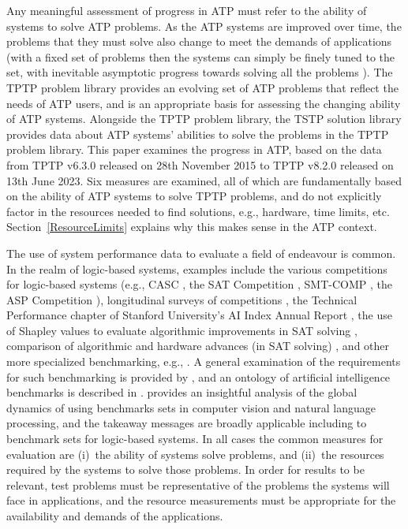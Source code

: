 \documentclass[runningheads]{llncs}
\begin{document}
Any meaningful assessment of progress in ATP must refer to the ability of systems to solve 
ATP problems.
As the ATP systems are improved over time, the problems that they must solve also change to meet 
the demands of applications (with a fixed set of problems then the systems can simply be finely 
tuned to the set, with inevitable asymptotic progress towards solving all the problems 
\cite{OB+22}).
The TPTP problem library provides an evolving set of ATP problems that reflect the needs of 
ATP users, and is an appropriate basis for assessing the changing ability of ATP systems.
Alongside the TPTP problem library, the TSTP solution library provides data about ATP systems' 
abilities to solve the problems in the TPTP problem library.
This paper examines the progress in ATP, based on the data from TPTP v6.3.0 released on 
28th November 2015 to TPTP v8.2.0 released on 13th June 2023.
Six measures are examined, all of which
are fundamentally based on the ability of ATP systems to solve TPTP problems, and do not 
explicitly factor in the resources needed to find solutions, e.g., hardware, time limits, etc. 
Section~\ref{ResourceLimits} explains why this makes sense in the ATP context.

The use of system performance data to evaluate a field of endeavour is common.
In the realm of logic-based systems, examples include
the various competitions \cite{BB+19} for logic-based systems (e.g., CASC \cite{Sut16}, the SAT 
Competition \cite{JL+12}, SMT-COMP \cite{BdS05}, the ASP Competition \cite{CI+12}),
longitudinal surveys of competitions \cite{SS06-SoCASC,CSW15},
the Technical Performance chapter of Stanford University's AI Index Annual Report \cite{MF+23},
the use of Shapley values to evaluate algorithmic improvements in SAT solving \cite{FK+16,KF+19},
comparison of algorithmic and hardware advances (in SAT solving) \cite{FHS20},
and
other more specialized benchmarking, e.g., \cite{ZHP22}.
A general examination of the requirements for such benchmarking is provided by \cite{BLW19}, and
an ontology of artificial intelligence benchmarks is described in \cite{BB+22-SD}.
\cite{OB+22} provides an insightful analysis of the global dynamics of using benchmarks sets in
computer vision and natural language processing, and the takeaway messages are broadly applicable 
including to benchmark sets for logic-based systems.
In all cases the common measures for evaluation are (i)~the ability of systems solve problems, 
and (ii)~the resources required by the systems to solve those problems.
In order for results to be relevant, test problems must be representative of the problems
the systems will face in applications, and the resource measurements must be appropriate for 
the availability and demands of the applications.
\end{document}
